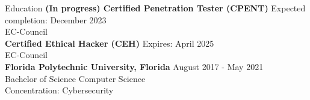 \documentclass{resume} %
\begin{document}

\begin{rSection}{Education}
{\bf (In progress) Certified Penetration Tester (CPENT)} \hfill {Expected completion: December 2023}
\\ EC-Council \\
{\bf Certified Ethical Hacker (CEH)} \hfill {Expires: April 2025}
\\ EC-Council \\
{\bf Florida Polytechnic University, Florida} \hfill {August 2017 - May 2021} 
\\ Bachelor of Science Computer Science\hfill %
\\ Concentration: Cybersecurity
\end{rSection}





\end{document}
